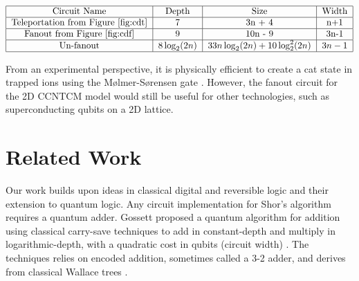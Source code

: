 \documentclass[twoside]{article}
\begin{document}
\begin{table}
\begin{displaymath}
\begin{tabular}{|c|c|c|c|}
\hline
\text{Circuit Name} & \text{Depth} & \text{Size} & \text{Width}\\
\hline
\text{Teleportation from Figure \ref{fig:cdt}} & 7 & 3n + 4 & n+1\\
\hline
\text{Fanout from Figure \ref{fig:cdf}} & 9 & 10n - 9 & 3n-1 \\
\hline
\text{Un-fanout} & $8\log_2(2n)$ & $33n\log_2(2n) + 10\log^2_2(2n)$ & $3n-1$ \\
\hline
\end{tabular}
\end{displaymath}
\centerline{}
\label{tab:cd-resources}
\end{table}

From an experimental perspective, it is physically efficient to create
a cat state in trapped ions using the M{\o}lmer-S{\o}rensen gate
\cite{Sorensen2000}\cite{Benhelm2008}. However, the fanout circuit for
the 2D CCNTCM model would still be useful for other technologies, such
as superconducting qubits on a 2D lattice.


%
\section{Related Work}
\label{sec:related}

Our work builds upon ideas in classical digital and reversible logic and their extension to quantum logic.
Any circuit implementation for Shor's algorithm requires a quantum adder.
Gossett proposed a quantum algorithm for addition using classical carry-save techniques to add
in constant-depth and multiply in logarithmic-depth, with a quadratic
cost in qubits (circuit width) \cite{Gossett1998}. The techniques relies on encoded addition, sometimes
called a 3-2 adder, and derives from classical Wallace trees \cite{Wallace1964}.
\end{document}
